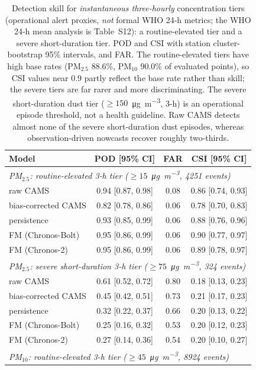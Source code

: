 \documentclass[11pt]{article}
\newcommand*{\pmtf}{\ensuremath{\mathrm{PM_{2.5}}}}
\newcommand*{\pmten}{\ensuremath{\mathrm{PM_{10}}}}
\begin{document}
\begin{table}[htbp]\centering\footnotesize
\caption{Detection skill for \emph{instantaneous three-hourly} concentration tiers (operational alert proxies, \emph{not} formal WHO 24-h metrics; the WHO 24-h mean analysis is Table~S12): a routine-elevated tier and a severe short-duration tier. POD and CSI with station cluster-bootstrap 95\% intervals, and FAR. The routine-elevated tiers have high base rates (\pmtf{} 88.6\%, \pmten{} 90.0\% of evaluated points), so CSI values near 0.9 partly reflect the base rate rather than skill; the severe tiers are far rarer and more discriminating. The severe short-duration dust tier ($\geq150$~\si{\micro\gram\per\cubic\metre}, 3-h) is an operational episode threshold, not a health guideline. Raw CAMS detects almost none of the severe short-duration dust episodes, whereas observation-driven nowcasts recover roughly two-thirds.}
\begin{tabular}{lccc}\toprule
Model & POD [95\% CI] & FAR & CSI [95\% CI] \\ \midrule
\multicolumn{4}{l}{\textit{PM$_{2.5}$: routine-elevated 3-h tier ($\geq15$~\si{\micro\gram\per\cubic\metre}, 4251 events)}} \\
\quad raw CAMS & 0.94 [0.87, 0.98] & 0.08 & 0.86 [0.74, 0.93] \\
\quad bias-corrected CAMS & 0.82 [0.78, 0.86] & 0.06 & 0.78 [0.70, 0.83] \\
\quad persistence & 0.93 [0.85, 0.99] & 0.06 & 0.88 [0.76, 0.96] \\
\quad FM (Chronos-Bolt) & 0.95 [0.86, 0.99] & 0.06 & 0.90 [0.77, 0.97] \\
\quad FM (Chronos-2) & 0.95 [0.86, 0.99] & 0.06 & 0.89 [0.78, 0.97] \\
\multicolumn{4}{l}{\textit{PM$_{2.5}$: severe short-duration 3-h tier ($\geq75$~\si{\micro\gram\per\cubic\metre}, 324 events)}} \\
\quad raw CAMS & 0.61 [0.52, 0.72] & 0.80 & 0.18 [0.13, 0.23] \\
\quad bias-corrected CAMS & 0.45 [0.42, 0.51] & 0.73 & 0.21 [0.17, 0.23] \\
\quad persistence & 0.32 [0.22, 0.37] & 0.66 & 0.20 [0.13, 0.22] \\
\quad FM (Chronos-Bolt) & 0.25 [0.16, 0.32] & 0.53 & 0.20 [0.12, 0.23] \\
\quad FM (Chronos-2) & 0.27 [0.14, 0.36] & 0.54 & 0.20 [0.10, 0.27] \\
\multicolumn{4}{l}{\textit{PM$_{10}$: routine-elevated 3-h tier ($\geq45$~\si{\micro\gram\per\cubic\metre}, 8924 events)}} \\

\end{tabular}
\end{table}
\end{document}
